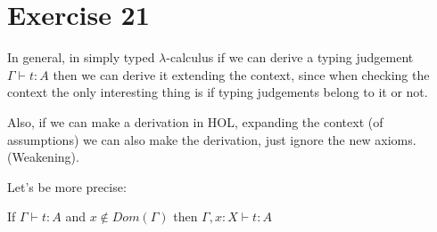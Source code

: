 \section{Exercise 21}

In general, in simply typed $\lambda$-calculus
if we can derive a typing judgement $\Gamma \vdash t : A$
then we can derive it extending the context, since when checking the context
the only interesting thing is if typing judgements belong to it
or not.

Also, if we can make a derivation in HOL,
expanding the context (of assumptions) we can also make the derivation,
just ignore the new axioms. (Weakening).

Let's be more precise:

\begin{lemma}
  
  If $\Gamma \vdash t : A$ and $x \notin Dom(\Gamma)$
  then $\Gamma, x:X \vdash t : A$
\end{lemma}
